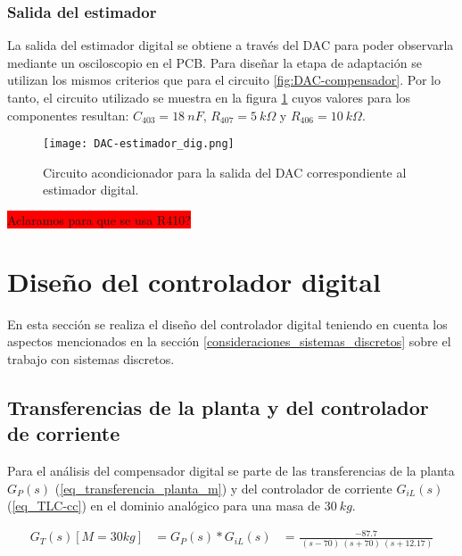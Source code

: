 \subsubsection{Salida del estimador}

La salida del estimador digital se obtiene a través del DAC para poder observarla mediante un osciloscopio en el PCB. Para diseñar la etapa de adaptación se utilizan los mismos criterios que para el circuito \ref{fig:DAC-compensador}. Por lo tanto, el circuito utilizado se muestra en la figura \ref{fig:DAC-estimador} cuyos valores para los componentes resultan: $C_{403}=18\:nF$, $R_{407}=5\:k\Omega$ y $R_{406}=10\:k\Omega$.

\begin{figure}[H]
	\centering
	\texttt{[image: DAC-estimador\_dig.png]}
	\caption{Circuito acondicionador para la salida del DAC correspondiente al estimador digital.}
	\label{fig:DAC-estimador}
\end{figure}

\colorbox{red}{Aclaramos para que se usa R410?}

\section{Diseño del controlador digital}

En esta sección se realiza el diseño del controlador digital teniendo en cuenta los aspectos mencionados en la sección  \ref{consideraciones_sistemas_discretos} sobre el trabajo con sistemas discretos.


\subsection{Transferencias de la planta y del controlador de corriente}

 Para el análisis del compensador digital se parte de las transferencias de la planta $G_P(s)$ (\ref{eq_transferencia_planta_m}) y del controlador de corriente $G_{iL}(s) $ (\ref{eq_TLC-cc}) en el dominio analógico para una masa de $30 \:kg$.

\begin{equation} 
	\begin{aligned}
		G_T(s)[M=30kg]&=G_P(s)*G_{iL}(s)&=\frac{-87.7}{\ (s-70)\ (s+70)\ (s+12.17)}\\
	\end{aligned}
\end{equation}



